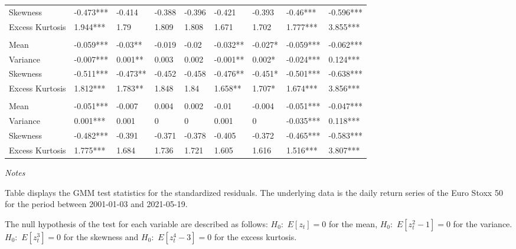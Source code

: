 \documentclass[a4paper, twoside]{templates/ociamthesis}
\begin{document}
\begin{landscape}
\begin{table}[h!]
\begin{threeparttable}
{\begin{tabular}[t]{lllllllll}
\hspace{1em}Skewness & -0.473*** & -0.414 & -0.388 & -0.396 & -0.421 & -0.393 & -0.46*** & -0.596***\\
\hspace{1em}Excess Kurtosis & 1.944*** & 1.79 & 1.809 & 1.808 & 1.671 & 1.702 & 1.777*** & 3.855***\\
\addlinespace[0.3em]
\multicolumn{9}{l}{\textbf{Panel D: T}}\\
\hspace{1em}Mean & -0.059*** & -0.03** & -0.019 & -0.02 & -0.032** & -0.027* & -0.059*** & -0.062***\\
\hspace{1em}Variance & -0.007*** & 0.001** & 0.003 & 0.002 & -0.001** & 0.002* & -0.024*** & 0.124***\\
\hspace{1em}Skewness & -0.511*** & -0.473** & -0.452 & -0.458 & -0.476** & -0.451* & -0.501*** & -0.638***\\
\hspace{1em}Excess Kurtosis & 1.812*** & 1.783** & 1.848 & 1.84 & 1.658** & 1.707* & 1.674*** & 3.856***\\
\addlinespace[0.3em]
\multicolumn{9}{l}{\textbf{Panel E: N}}\\
\hspace{1em}Mean & -0.051*** & -0.007 & 0.004 & 0.002 & -0.01 & -0.004 & -0.051*** & -0.047***\\
\hspace{1em}Variance & 0.001*** & 0.001 & 0 & 0 & 0.001 & 0 & -0.035*** & 0.118***\\
\hspace{1em}Skewness & -0.482*** & -0.391 & -0.371 & -0.378 & -0.405 & -0.372 & -0.465*** & -0.583***\\
\hspace{1em}Excess Kurtosis & 1.775*** & 1.684 & 1.736 & 1.721 & 1.605 & 1.616 & 1.516*** & 3.807***\\
\bottomrule
\end{tabular}}
\begin{tablenotes}[para]
\item \textit{Notes} 
\item Table displays the GMM test statistics for the standardized residuals. The underlying data is the daily return series of the Euro Stoxx 50 for the period between 2001-01-03 and 2021-05-19.
\item The null hypothesis of the test for each variable are described as follows: $H_0: $ $E[z_{t}] = 0$ for the mean, $H_0: $ $E[z_{t}^2-1] = 0$ for the variance. $H_0: $ $E[z_{t}^3] = 0$ for the skewness and $H_0: $ $E[z_{t}^4-3] = 0$ for the excess kurtosis.
\end{tablenotes}
\end{threeparttable}
\end{table}
\end{landscape}
\end{document}
